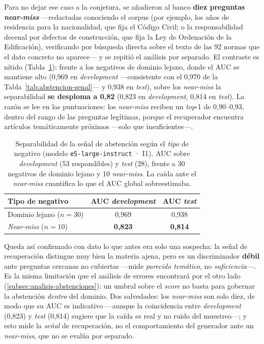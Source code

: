 Para no dejar ese caso a la conjetura, se añadieron al banco \textbf{diez preguntas \emph{near-miss}} —redactadas conociendo el corpus (por ejemplo, los años de residencia para la nacionalidad, que fija el Código Civil; o la responsabilidad decenal por defectos de construcción, que fija la Ley de Ordenación de la Edificación), verificando por búsqueda directa sobre el texto de las 92 normas que el dato concreto no aparece— y se repitió el análisis por separado. El contraste es nítido (Tabla~\ref{tab:abstencion-nearmiss}): frente a los negativos de dominio lejano, donde el AUC se mantiene alto (0,969 en \emph{development} —consistente con el 0,970 de la Tabla~\ref{tab:abstencion-senal}— y 0,938 en \emph{test}), sobre los \emph{near-miss} la separabilidad \textbf{se desploma a 0,82} (0,823 en \emph{development}, 0,814 en \emph{test}). La razón se lee en las puntuaciones: los \emph{near-miss} reciben un \emph{top}-1 de 0,90--0,93, dentro del rango de las preguntas legítimas, porque el recuperador encuentra artículos temáticamente próximos —solo que insuficientes—.

\begin{table}[htbp]
    \centering
    \small
    \renewcommand{\arraystretch}{1.2}
    \caption{Separabilidad de la señal de abstención según el \emph{tipo} de negativo (modelo \texttt{e5-large-instruct} · I1). AUC sobre \emph{development} (53 respondibles) y \emph{test} (28), frente a 30 negativos de dominio lejano y 10 \emph{near-miss}. La caída ante el \emph{near-miss} cuantifica lo que el AUC global sobreestimaba.}
    \label{tab:abstencion-nearmiss}
    \begin{tabular}{|l|c|c|}
        \hline
        \textbf{Tipo de negativo} & \textbf{AUC \emph{development}} & \textbf{AUC \emph{test}} \\
        \hline
        Dominio lejano ($n=30$)   & 0,969 & 0,938 \\
        \emph{Near-miss} ($n=10$) & \textbf{0,823} & \textbf{0,814} \\
        \hline
    \end{tabular}
\end{table}

Queda así confirmado con dato lo que antes era solo una sospecha: la señal de recuperación distingue muy bien la materia ajena, pero es un discriminador \textbf{débil} ante preguntas cercanas no cubiertas —mide \emph{parecido temático}, no \emph{suficiencia}—. Es la misma limitación que el análisis de errores encontrará por el otro lado (\ref{subsec:analisis-abstenciones}): un umbral sobre el \emph{score} no basta para gobernar la abstención \emph{dentro} del dominio. Dos salvedades: los \emph{near-miss} son solo diez, de modo que su AUC es indicativo —aunque la coincidencia entre \emph{development} (0,823) y \emph{test} (0,814) sugiere que la caída es real y no ruido del muestreo—; y esto mide la \emph{señal} de recuperación, no el comportamiento del generador ante un \emph{near-miss}, que no se evalúa por separado.

